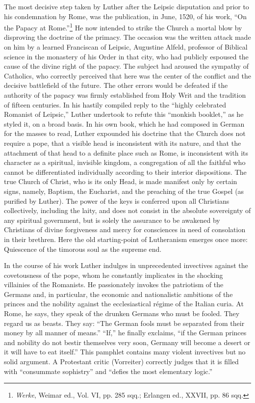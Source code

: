 The most decisive step taken by Luther after the Leipsic disputation and
prior to his condemnation by Rome, was the publication, in
June, 1520, of his work, “On the Papacy at Rome.”\footnote
{\textit{Werke}, Weimar ed., Vol. VI, pp. 285 sqq.; Erlangen ed., XXVII, pp. 86 sqq.}
He now intended to strike the Church a mortal blow by disproving the doctrine
of the primacy. The occasion was the written attack made on him by
a learned Franciscan of Leipsic, Augustine Alfeld, professor of Biblical
science in the monastery of his Order in that city, who had
publicly espoused the cause of the divine right of the papacy. The subject
had aroused the sympathy of Catholics, who correctly perceived
that here was the center of the conflict and the decisive battlefield
of the future. The other errors would be defeated if the authority of
the papacy was firmly established from Holy Writ and the tradition
of fifteen centuries. In his hastily compiled reply to the “highly
celebrated Romanist of Leipsic,” Luther undertook to refute this
“monkish booklet,” as he styled it, on a broad basis. In his own book,
which he had composed in German for the masses to read, Luther
expounded his doctrine that the Church does not require a pope,
that a visible head is inconsistent with its nature, and that the attachment
of that head to a definite place such as Rome, is inconsistent
with its character as a spiritual, invisible kingdom, a congregation of
all the faithful who cannot be differentiated individually according to
their interior dispositions. The true Church of Christ,
who is its only Head, is made manifest only by certain signs, namely,
Baptism, the Eucharist, and the preaching of the true Gospel (as
purified by Luther). The power of the keys is conferred upon all
Christians collectively, including the laity, and does not consist in the
absolute sovereignty of any spiritual government, but is solely the
assurance to be awakened by Christians of divine forgiveness and
mercy for consciences in need of consolation in their brethren. Here
the old starting-point of Lutheranism emerges once more: Quiescence
of the timorous soul as the supreme end.

In the course of his work Luther indulges in unprecedented invectives against
the covetousness of the pope, whom he constantly
implicates in the shocking villainies of the Romanists. He passionately
invokes the patriotism of the Germans and, in particular, the economic
and nationalistic ambitions of the princes and the nobility against
the ecclesiastical régime of the Italian curia. At Rome, he
says, they speak of the drunken Germans who must be fooled. They
regard us as beasts. They say: “The German fools must be separated
from their money by all manner of means.” “If,” he finally exclaims,
“if the German princes and nobility do not bestir themselves very
soon, Germany will become a desert or it will have to eat itself.”
This pamphlet contains many violent invectives but no solid argument. A
Protestant critic (Vorreiter) correctly judges that it is
filled with “consummate sophistry” and “defies the most elementary
logic.”

